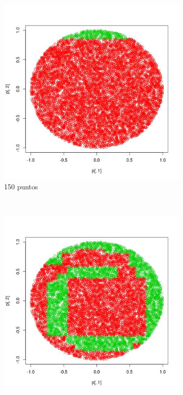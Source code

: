 \documentclass[12pt, a4paper]{article}
\begin{document}
\begin{figure}
    \centering

    \begin{subfigure}[b]{0.45\textwidth}
        \includegraphics[width=\textwidth]{espirales150}
        \caption{150 puntos}
    \end{subfigure}
      ~ %
    \begin{subfigure}[b]{0.45\textwidth}
        \includegraphics[width=\textwidth]{espirales600}

\end{subfigure}
\end{figure}
\end{document}
